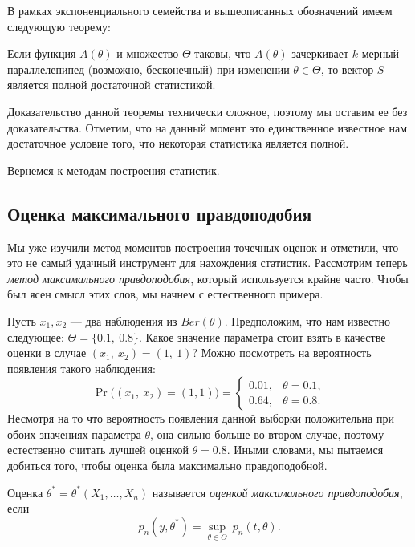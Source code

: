 В рамках экспоненциального семейства и вышеописанных обозначений имеем следующую теорему:
\begin{theorem}
    Если функция $A(\theta)$ и множество $\Theta$ таковы, что $A(\theta)$ зачеркивает $k$-мерный параллелепипед (возможно, бесконечный) при изменении $\theta \in \Theta$, то вектор $S$ является полной достаточной статистикой.
\end{theorem}

Доказательство данной теоремы технически сложное, поэтому мы оставим ее без доказательства. Отметим, что на данный момент это единственное известное нам достаточное условие того, что некоторая статистика является полной.

Вернемся к методам построения статистик.

\subsection{Оценка максимального правдоподобия}

Мы уже изучили метод моментов построения точечных оценок и отметили, что это не самый удачный инструмент для нахождения статистик. Рассмотрим теперь \emph{метод максимального правдоподобия}, который используется крайне часто. Чтобы был ясен смысл этих слов, мы начнем с естественного примера.

\begin{example}
    Пусть $x_1, x_2$ --- два наблюдения из $Ber(\theta)$. Предположим, что нам известно следующее: $\Theta = \{0.1,\ 0.8\}$. Какое значение параметра стоит взять в качестве оценки в случае $(x_1,\ x_2) = (1,\ 1)$? Можно посмотреть на вероятность появления такого наблюдения:
    \[
        \Pr\big( (x_1,\ x_2) = (1, 1) \big) = \begin{cases} 0.01, & \theta = 0.1, \\ 0.64, & \theta = 0.8. \end{cases}
    \]
Несмотря на то что вероятность появления данной выборки положительна при обоих значениях параметра $\theta$, она сильно больше во втором случае, поэтому естественно считать лучшей оценкой $\theta = 0.8$. Иными словами, мы пытаемся добиться того, чтобы оценка была максимально правдоподобной.
\end{example}

\begin{definition}
    Оценка $\theta^* = \theta^*(X_1, \ldots, X_n)$ называется \emph{оценкой максимального правдоподобия}, если
    \[
        p_n(y, \theta^*) = \sup_{\theta \in \Theta}\ p_n(t, \theta).
    \]
\end{definition}

